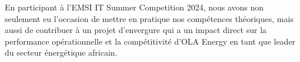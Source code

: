 \documentclass[a4paper,12pt]{report} %
\begin{document}
En participant à l'EMSI IT Summer Competition 2024, nous avons non seulement eu l'occasion de mettre en pratique nos compétences théoriques, mais aussi de contribuer à un projet d'envergure qui a un impact direct sur la performance opérationnelle et la compétitivité d'OLA Energy en tant que leader du secteur énergétique africain.
\end{document}
